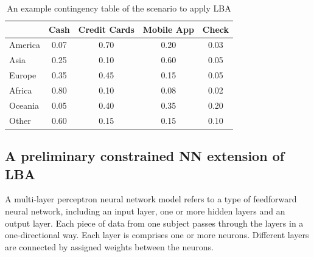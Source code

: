 \documentclass[]{interact}
\theoremstyle{plain}%
\theoremstyle{definition}
\theoremstyle{remark}
\begin{document}
\begin{table}[H]

\caption{\label{tab:example_lba}An example contingency table of the scenario to apply LBA}
\centering
\begin{tabular}[t]{lcccc}
\toprule
\textbf{ } & \textbf{Cash} & \textbf{Credit Cards} & \textbf{Mobile App} & \textbf{Check}\\
\midrule
America & 0.07 & 0.70 & 0.20 & 0.03\\
Asia & 0.25 & 0.10 & 0.60 & 0.05\\
Europe & 0.35 & 0.45 & 0.15 & 0.05\\
Africa & 0.80 & 0.10 & 0.08 & 0.02\\
Oceania & 0.05 & 0.40 & 0.35 & 0.20\\
\addlinespace
Other & 0.60 & 0.15 & 0.15 & 0.10\\
\bottomrule
\end{tabular}
\end{table}

\hypertarget{subsection:prelba}{%
\subsection{A preliminary constrained NN extension of
LBA}\label{subsection:prelba}}

A multi-layer perceptron neural network model refers to a type of
feedforward neural network, including an input layer, one or more hidden
layers and an output layer. Each piece of data from one subject passes
through the layers in a one-directional way. Each layer is comprises one
or more neurons. Different layers are connected by assigned weights
between the neurons.
\end{document}
